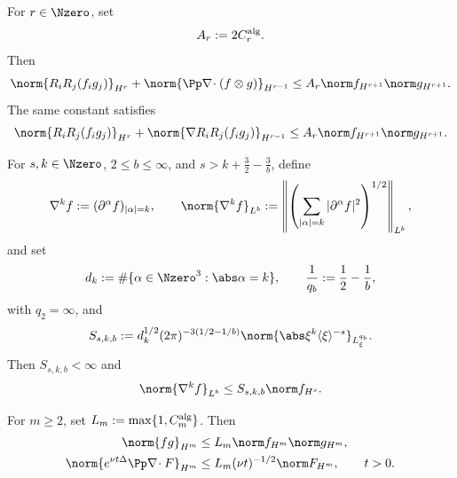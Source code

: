 \begin{lemma}
\label{lem:qc-analytic-constants}
For \(r\in\Nzero\), set
\[
 A_r:=2C_r^{\rm alg}.
\]
Then
\begin{equation}
 \norm{R_iR_j(f_i g_j)}_{H^r}
 +\norm{\Pp\nabla\!\cdot(f\otimes g)}_{H^{r-1}}
 \le A_r\norm f_{H^{r+1}}\norm g_{H^{r+1}}.
 \label{eq:qc-product-constant}
\end{equation}
The same constant satisfies
\begin{equation}
 \norm{R_iR_j(f_i g_j)}_{H^r}
 +\norm{\nabla R_iR_j(f_i g_j)}_{H^{r-1}}
 \le A_r\norm f_{H^{r+1}}\norm g_{H^{r+1}}.
 \label{eq:qc-pressure-product-constant}
\end{equation}
\begin{samepage}
For \(s,k\in\Nzero\), \(2\le b\le\infty\), and
\(s>k+\frac32-\frac3b\), define
\[
 \nabla^k f:=(\partial^\alpha f)_{|\alpha|=k},
 \qquad
 \norm{\nabla^k f}_{L^b}
 :=\left\|\left(
   \sum_{|\alpha|=k}|\partial^\alpha f|^2
 \right)^{1/2}\right\|_{L^b},
\]
and set
\[
 d_k:=\#\{\alpha\in\Nzero^3:\abs\alpha=k\},
 \qquad
 \frac1{q_b}:=\frac12-\frac1b,
\]
with \(q_2=\infty\), and
\begin{equation}
 S_{s,k,b}:=
 d_k^{1/2}(2\pi)^{-3(1/2-1/b)}
 \norm{\abs\xi^k\langle\xi\rangle^{-s}}_{L^{q_b}_\xi}.
 \label{eq:qc-embedding-constant-definition}
\end{equation}
Then \(S_{s,k,b}<\infty\) and
\begin{equation}
 \norm{\nabla^k f}_{L^b}\le S_{s,k,b}\norm f_{H^s}.
 \label{eq:qc-embedding-constant}
\end{equation}
\par
\end{samepage}
For \(m\ge2\), set \(L_m:=\max\{1,C_m^{\rm alg}\}\).  Then
\begin{align}
 \norm{fg}_{H^m}
 &\le L_m\norm f_{H^m}\norm g_{H^m},
 \label{eq:qc-algebra-constant}\\
 \norm{e^{\nu t\Delta}\Pp\nabla\!\cdot F}_{H^m}
 &\le L_m(\nu t)^{-1/2}\norm F_{H^m},
 \qquad t>0.
 \label{eq:qc-heat-constant}
\end{align}
\end{lemma}

